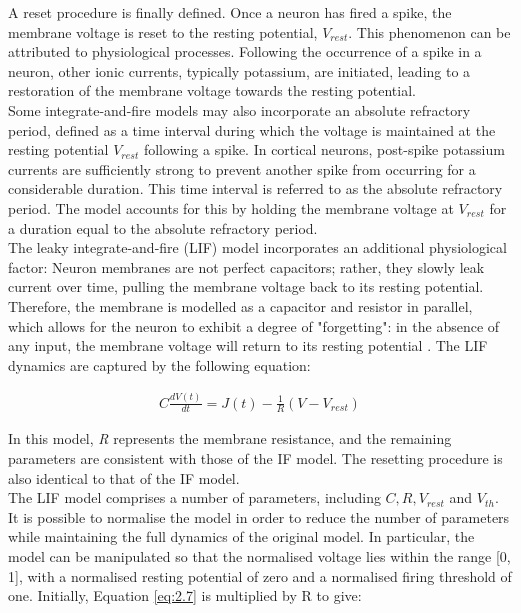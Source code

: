 \noindent A reset procedure is finally defined. Once a neuron has fired a spike, the membrane voltage is reset to the resting potential, $V_{rest}$. This phenomenon can be attributed to physiological processes. Following the occurrence of a spike in a neuron, other ionic currents, typically potassium, are initiated, leading to a restoration of the membrane voltage towards the resting potential.\\


\noindent Some integrate-and-fire models may also incorporate an absolute refractory period, defined as a time interval during which the voltage is maintained at the resting potential $V_{rest}$ following a spike. In cortical neurons, post-spike potassium currents are sufficiently strong to prevent another spike from occurring for a considerable duration. This time interval is referred to as the absolute refractory period. The model accounts for this by holding the membrane voltage at $V_{rest}$ for a duration equal to the absolute refractory period. \\

\noindent The leaky integrate-and-fire (LIF) model \cite{knight1972dynamics} incorporates an additional physiological factor: Neuron membranes are not perfect capacitors; rather, they slowly leak current over time, pulling the membrane voltage back to its resting potential. Therefore, the membrane is modelled as a capacitor and resistor in parallel, which allows for the neuron to exhibit a degree of "forgetting": in the absence of any input, the membrane voltage will return to its resting potential \cite{koch2004biophysics}. The LIF dynamics are captured by the following equation:

\begin{align}
C \frac{dV(t)}{dt} = J(t) - \frac{1}{R} (V - V_{rest}) \label{eq:2.7} 
\end{align}

\noindent In this model, \textit{R} represents the membrane resistance, and the remaining parameters are consistent with those of the IF model. The resetting procedure is also identical to that of the IF model.\\

\noindent The LIF model comprises a number of parameters, including $C, R, V_{rest}$ and $V_{th}$. It is possible to normalise the model in order to reduce the number of parameters while maintaining the full dynamics of the original model. In particular, the model can be manipulated so that the normalised voltage lies within the range [0, 1], with a normalised resting potential of zero and a normalised firing threshold of one. Initially, Equation \ref{eq:2.7} is multiplied by R to give:

